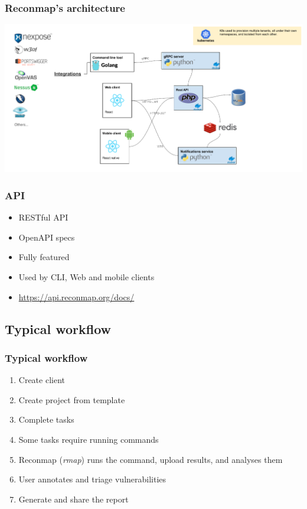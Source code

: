 \begin{frame}
    \frametitle{Reconmap's architecture}

    \note[item]{
    }
    
	\includegraphics[]{reconmap-architecture.png}
\end{frame}

\begin{frame}
    \frametitle{API}

    \note[item]{
    }

	\begin{itemize}
		\item RESTful API
		\item OpenAPI specs
		\item Fully featured
		\item Used by CLI, Web and mobile clients
		\item \url{https://api.reconmap.org/docs/}
	\end{itemize}
\end{frame}

\subsection{Typical workflow}

\begin{frame}
    \frametitle{Typical workflow}

    \note[item]{
    }
    
    \begin{enumerate}
    \item Create client
    	\item Create project from template
    	\item Complete tasks
    	\item Some tasks require running commands
    	\item Reconmap (\textit{rmap}) runs the command, upload results, and analyses them
    	\item User annotates and triage vulnerabilities
    	\item Generate and share the report
    \end{enumerate}
\end{frame}

